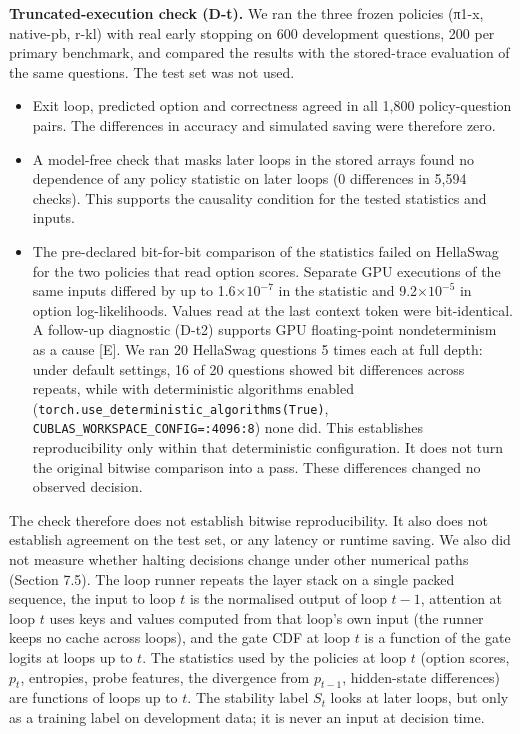 \textbf{Truncated-execution check (D-t).} We ran the three frozen policies (π1-x, native-pb, r-kl) with real early stopping on 600 development questions, 200 per primary benchmark, and compared the results with the stored-trace evaluation of the same questions. The test set was not used.

\begin{itemize}
\tightlist
\item
  Exit loop, predicted option and correctness agreed in all 1,800 policy-question pairs. The differences in accuracy and simulated saving were therefore zero.
\item
  A model-free check that masks later loops in the stored arrays found no dependence of any policy statistic on later loops (0 differences in 5,594 checks). This supports the causality condition for the tested statistics and inputs.
\item
  The pre-declared bit-for-bit comparison of the statistics failed on HellaSwag for the two policies that read option scores. Separate GPU executions of the same inputs differed by up to 1.6\(\times 10^{-7}\) in the statistic and 9.2\(\times 10^{-5}\) in option log-likelihoods. Values read at the last context token were bit-identical. A follow-up diagnostic (D-t2) supports GPU floating-point nondeterminism as a cause {[}E{]}. We ran 20 HellaSwag questions 5 times each at full depth: under default settings, 16 of 20 questions showed bit differences across repeats, while with deterministic algorithms enabled (\texttt{torch.use\_deterministic\_algorithms(True)}, \texttt{CUBLAS\_WORKSPACE\_CONFIG=:4096:8}) none did. This establishes reproducibility only within that deterministic configuration. It does not turn the original bitwise comparison into a pass. These differences changed no observed decision.
\end{itemize}

The check therefore does not establish bitwise reproducibility. It also does not establish agreement on the test set, or any latency or runtime saving. We also did not measure whether halting decisions change under other numerical paths (Section 7.5). The loop runner repeats the layer stack on a single packed sequence, the input to loop \(t\) is the normalised output of loop \(t-1\), attention at loop \(t\) uses keys and values computed from that loop's own input (the runner keeps no cache across loops), and the gate CDF at loop \(t\) is a function of the gate logits at loops up to \(t\). The statistics used by the policies at loop \(t\) (option scores, \(p_t\), entropies, probe features, the divergence from \(p_{t-1}\), hidden-state differences) are functions of loops up to \(t\). The stability label \(S_t\) looks at later loops, but only as a training label on development data; it is never an input at decision time.

